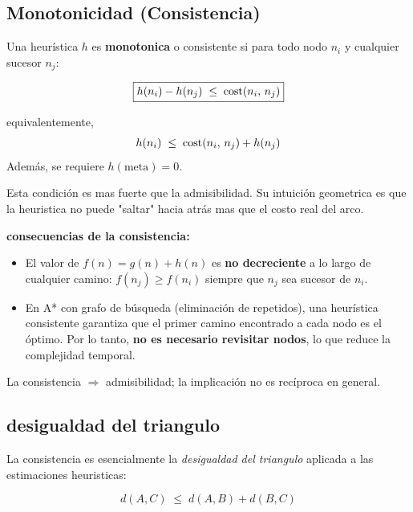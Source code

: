 \subsection{Monotonicidad (Consistencia)}
\begin{definition}
Una heurística $h$ es \textbf{monotonica} o consistente si para todo nodo $n_i$ y cualquier sucesor $n_j$:

\[
  \boxed{h(n_i) - h(n_j) \;\leq\; \mathrm{cost}(n_i,\,n_j)}
\]
 
equivalentemente,
\[
  h(n_i) \;\leq\; \mathrm{cost}(n_i,\,n_j) + h(n_j)
\]
Además, se requiere $h(\text{meta}) = 0$.
\end{definition}

Esta condición es mas fuerte que la admisibilidad. Su intuición geometrica es que la heuristica no puede "saltar" hacia atrás mas que el costo real del arco.

\textbf{consecuencias de la consistencia:}
\begin{itemize}
  \item El valor de $f(n) = g(n) + h(n)$ es \textbf{no decreciente} a lo
        largo de cualquier camino: $f(n_j) \geq f(n_i)$ siempre que $n_j$
        sea sucesor de $n_i$.
  \item En A* con grafo de búsqueda (eliminación de repetidos), una
        heurística consistente garantiza que el primer camino encontrado a
        cada nodo es el óptimo. Por lo tanto, \textbf{no es necesario
        revisitar nodos}, lo que reduce la complejidad temporal.
\end{itemize}

La consistencia $\Rightarrow$ admisibilidad; la implicación no es recíproca en general.


\subsection{desigualdad del triangulo}

La consistencia es esencialmente la \emph{desigualdad del triangulo} aplicada a las estimaciones heuristicas:

\[
  d(A, C) \;\leq\; d(A, B) + d(B, C)
\]
 

